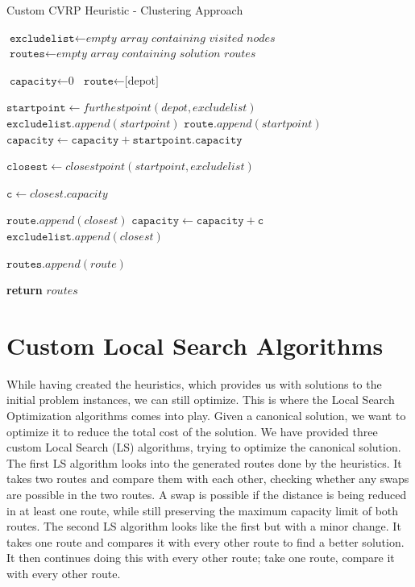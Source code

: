 \documentclass[12pt]{article}
\newcommand{\var}{\texttt}
\begin{document}
\begin{algorithm}[hbt!]
	\caption{Custom CVRP Heuristic - Clustering Approach}
	\begin{algorithmic}[1]
	\State $\var{excludelist} \gets \textit{empty array containing visited nodes}$
	\State $\var{routes} \gets \textit{empty array containing solution routes}$
		
	\State $\var{capacity} \gets \text{0}$
	\State $\var{route} \gets \text{[depot]}$
	
	\State $\var{startpoint} \gets furthestpoint(depot, excludelist)$
	\State $\var{excludelist}.append(startpoint)$
	\State $\var{route}.append(startpoint)$
	\State $\var{capacity} \gets \var{capacity} + \var{startpoint.capacity}$

			\State $\var{closest} \gets closestpoint(startpoint, excludelist)$

			\State $\var{c} \gets closest.capacity$

			\If{$\var{c} + \var{capacity} > \var{max capacity}$}
			\EndIf

			\State $\var{route}.append(closest)$
			\State $\var{capacity} \gets \var{capacity} + \var{c}$
			\State $\var{excludelist}.append(closest)$

		\EndWhile
		\State $\var{routes}.append(route)$

	\EndWhile

	\State \textbf{return} $routes$
	\EndFunction
	\end{algorithmic}
\end{algorithm}

\section{Custom Local Search Algorithms}
While having created the heuristics, which provides us with solutions to the initial problem instances, we can still optimize. This is where the Local Search Optimization algorithms comes into play. 
Given a canonical solution, we want to optimize it to reduce the total cost of the solution. We have provided three custom Local Search (LS) algorithms, trying to optimize the canonical solution. 
\newline
The first LS algorithm looks into the generated routes done by the heuristics. It takes two routes and compare them with each other, checking whether any swaps are possible in the two routes. 
A swap is possible if the distance is being reduced in at least one route, while still preserving the maximum capacity limit of both routes. 
The second LS algorithm looks like the first but with a minor change. It takes one route and compares it with every other route to find a better solution. It then continues doing this 
with every other route; take one route, compare it with every other route. 
\end{document}
